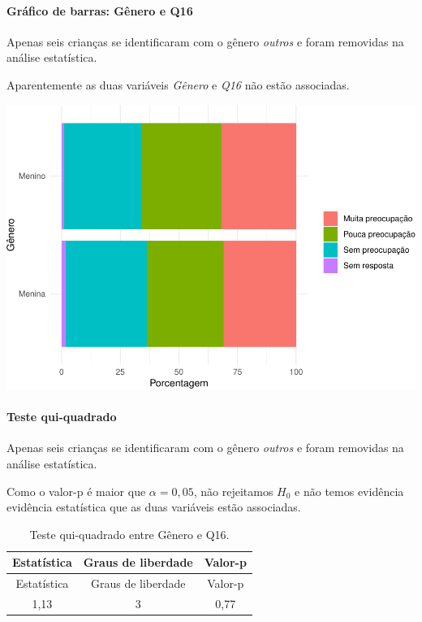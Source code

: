 \documentclass[]{article}
\let\oldparagraph\paragraph
\renewcommand{\paragraph}[1]{\oldparagraph{#1}\mbox{}}
\begin{document}
\hypertarget{gruxe1fico-de-barras-guxeanero-e-q16}{%
\paragraph{Gráfico de barras: Gênero e Q16}\label{gruxe1fico-de-barras-guxeanero-e-q16}}

Apenas seis crianças se identificaram com o gênero \emph{outros} e foram removidas na análise estatística.

Aparentemente as duas variáveis \emph{Gênero} e \emph{Q16} não estão associadas.

\begin{center}\includegraphics[width=0.75\linewidth]{relatorio_files/figure-latex/unnamed-chunk-144-1} \end{center}

\hypertarget{teste-qui-quadrado-13}{%
\paragraph{Teste qui-quadrado}\label{teste-qui-quadrado-13}}

Apenas seis crianças se identificaram com o gênero \emph{outros} e foram removidas na análise estatística.

Como o valor-p é maior que \(\alpha=0,05\), não rejeitamos \(H_0\) e não temos evidência evidência estatística que as duas variáveis estão associadas.

\begin{longtable}[]{@{}ccc@{}}
\caption{\label{tab:unnamed-chunk-145}Teste qui-quadrado entre Gênero e Q16.}\tabularnewline
\toprule
Estatística & Graus de liberdade & Valor-p\tabularnewline
\midrule
\endfirsthead
\toprule
Estatística & Graus de liberdade & Valor-p\tabularnewline
\midrule
\endhead
1,13 & 3 & 0,77\tabularnewline
\bottomrule
\end{longtable}
\end{document}
